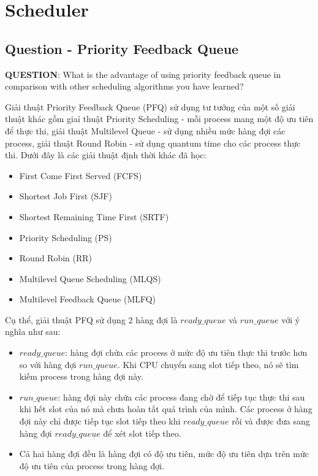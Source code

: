 \section{Scheduler}

\subsection{Question - Priority Feedback Queue}

\vspace{0.5cm}

\textbf{QUESTION}: What is the advantage of using priority feedback queue in comparison with other scheduling algorithms you have learned?

\vspace{0.5cm}

Giải thuật Priority Feedback Queue (PFQ) sử dụng tư tưởng của một số giải thuật khác gồm giaỉ thuật Priority Scheduling - mỗi process mang một độ ưu tiên để thực thi, giải thuật Multilevel Queue - sử dụng nhiều mức hàng đợi các process, giải thuật Round Robin - sử dụng quantum time cho các process thực thi. Dưới đây là các giải thuật định thời khác đã học:

\vspace{0.5cm}

\begin{itemize}
	\item First Come First Served (FCFS)
	\item Shortest Job First (SJF)
	\item Shortest Remaining Time First (SRTF)
	\item Priority Scheduling (PS)
	\item Round Robin (RR)
	\item Multilevel Queue Scheduling (MLQS)
	\item Multilevel Feedback Queue (MLFQ)
\end{itemize}

\vspace{0.5cm}

Cụ thể, giải thuật PFQ sử dụng 2 hàng đợi là $ ready\_queue $ và $ run\_queue $ với ý nghĩa như sau:

\vspace{0.5cm}

\begin{itemize}
	\item $ ready\_queue $: hàng đợi chứa các process ở mức độ ưu tiên thực thi trước hơn so với hàng đợi $ run\_queue $. Khi CPU chuyển sang slot tiếp theo, nó sẽ tìm kiếm process trong hàng đợi này. 
	\item $ run\_queue $: hàng đợi này chứa các process đang chờ để tiếp tục thực thi sau khi hết slot của nó mà chưa hoàn tất quá trình của mình. Các process ở hàng đợi này chỉ được tiếp tục slot tiếp theo khi $ ready\_queue $ rỗi và được đưa sang hàng đợi  $ ready\_queue $ để xét slot tiếp theo.
	\item Cả hai hàng đợi đều là hàng đợi có độ ưu tiên, mức độ ưu tiên dựa trên mức độ ưu tiên của process trong hàng đợi.
\end{itemize}

